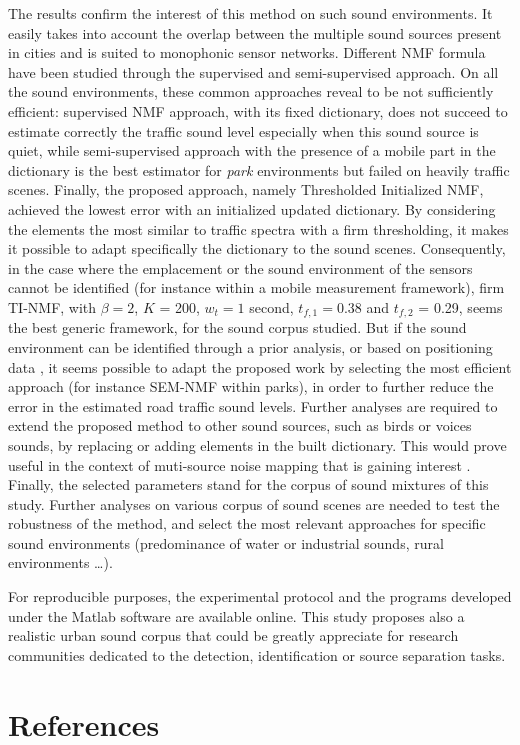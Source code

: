 \documentclass[review,5p,twocolumn,sort&compress,times]{elsarticle}
\begin{document}
The results confirm the interest of this method on such sound environments. It easily takes into account the overlap between the multiple sound sources present in cities and is suited to monophonic sensor networks. Different NMF formula have been studied through the supervised and semi-supervised approach. On all the sound environments, these common approaches reveal to be not sufficiently efficient: supervised NMF approach, with its fixed dictionary, does not succeed to estimate correctly the traffic sound level especially when this sound source is quiet, while semi-supervised approach with the presence of a mobile part in the dictionary is the best estimator for \textit{park} environments but failed on heavily traffic scenes. Finally, the proposed approach, namely Thresholded Initialized NMF, achieved the lowest error with an initialized updated dictionary. By considering the elements the most similar to traffic spectra with a firm thresholding, it makes it possible to adapt specifically the dictionary to the sound scenes. Consequently, in the case where the emplacement or the sound environment of the sensors cannot be identified (for instance within a mobile measurement framework), firm TI-NMF, with $\beta = 2$, $K$ = 200, $w_t = 1$ second, $t_{f,1} = 0.38$ and $t_{f,2}$ = 0.29, seems the best generic framework, for the sound corpus studied. But if the sound environment can be identified through a prior analysis, or based on positioning data \cite{can2015noise,lavandier2016urban}, it seems possible to adapt the proposed work by selecting the most efficient approach (for instance SEM-NMF within parks), in order to further reduce the error in the estimated road traffic sound levels.
Further analyses are required to extend the proposed method to other sound sources, such as birds or voices sounds, by replacing or adding elements in the built dictionary. This would prove useful in the context of muti-source noise mapping that is  gaining interest \cite{aumond2017Probabilistic, aletta2015soundscape}. Finally, the selected parameters stand for the corpus of sound mixtures of this study. Further analyses on various corpus of sound scenes are needed to test the robustness of the method, and select the most relevant approaches for specific sound environments (predominance of water or industrial sounds, rural environments \dots).

For reproducible purposes, the experimental protocol and the programs developed under the Matlab software are available online. This study proposes also a realistic urban sound corpus that could be greatly appreciate for research communities dedicated to the detection, identification or source separation tasks.


\section*{References}


\end{document}
